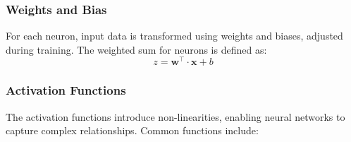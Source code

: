 \subsubsection{Weights and Bias}

For each neuron, input data is transformed using weights and biases, adjusted during training. The weighted sum for neurons is defined as:
\[
z = \mathbf{w^\intercal} \cdot \mathbf{x} + b
\]

\subsubsection{Activation Functions}

The activation functions introduce non-linearities, enabling neural networks to capture complex relationships. Common functions include:

